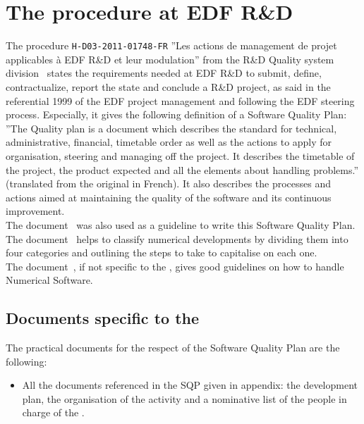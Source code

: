 \chapter{The procedure at EDF R\&D}

The procedure \verb!H-D03-2011-01748-FR! ''Les actions de management de projet
applicables à EDF R\&D et leur modulation'' from the R\&D Quality system
division~\cite{projmanag} states the requirements needed at EDF
R\&D to submit, define, contractualize, report the state and conclude a R\&D
project, as said in the referential 1999 of the EDF project management and
following the EDF steering process. Especially, it gives the following
definition of a Software Quality Plan: ''The Quality plan is a document which
describes the standard for technical, administrative, financial, timetable
order as well as the actions to apply for organisation, steering and managing
off the project. It describes the timetable of the project, the product
expected and all the elements about handling problems.'' (translated from the
original in French). It also describes the processes and actions aimed at
maintaining the quality of the software and its continuous improvement.\\

The document~\cite{guidepql} was also used as a guideline to write this
Software Quality Plan.\\

The document~\cite{capelemnum} helps to classify numerical developments by
dividing them into four categories and outlining the steps to take to
capitalise on each one.\\

The document~\cite{Ocs}, if not specific to the \telemacsystem{}, gives good
guidelines on how to handle Numerical Software.

\section{Documents specific to the \telemacsystem}

The practical documents for the respect of the Software Quality Plan are the
following:
\begin{itemize}
\item All the documents referenced in the SQP given in appendix: the
  development plan, the organisation of the \telemacsystem{} activity and a
  nominative list of the people in charge of the \telemacsystem{}.
\end{itemize}

